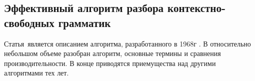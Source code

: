 \subsection{Эффективный алгоритм разбора контекстно-свободных грамматик} \label{subsection_Earley1983}
Статья\,\cite{Earley1983} является описанием алгоритма, разработанного в 1968г . В относительно небольшом объеме разобран алгоритм, основные термины и сравнения производительности. В  конце приводятся приемущества над другими алгоритмами тех лет. 

